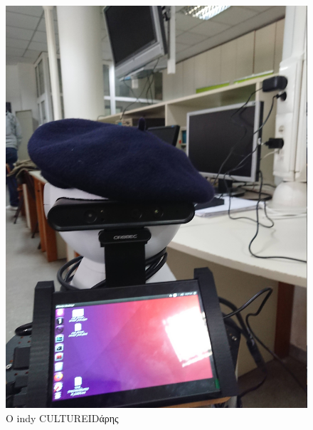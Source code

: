\begin{figure}[H]\centering
  \includegraphics[scale=0.1]{./figures/parts/appendix/chapters/06/indee.jpg}
  \caption{\small Ο indy CULTUREIDάρης}
\end{figure}


